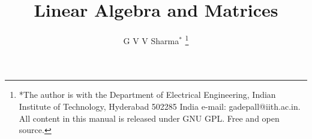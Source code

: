 \documentclass[journal,12pt,twocolumn]{IEEEtran}
\begin{document}
%


\newtheorem{theorem}{Theorem}[section]
\newtheorem{problem}{Problem}
\newtheorem{proposition}{Proposition}[section]
\newtheorem{lemma}{Lemma}[section]
\newtheorem{corollary}[theorem]{Corollary}
\newtheorem{example}{Example}[section]
\newtheorem{definition}[problem]{Definition}
\newcommand{\BEQA}{\begin{eqnarray}}
\newcommand{\EEQA}{\end{eqnarray}}
\newcommand{\define}{\stackrel{\triangle}{=}}




\providecommand{\mbf}{\mathbf}
\providecommand{\pr}[1]{\ensuremath{\Pr\left(#1\right)}}
\providecommand{\qfunc}[1]{\ensuremath{Q\left(#1\right)}}
\providecommand{\sbrak}[1]{\ensuremath{{}\left[#1\right]}}
\providecommand{\lsbrak}[1]{\ensuremath{{}\left[#1\right.}}
\providecommand{\rsbrak}[1]{\ensuremath{{}\left.#1\right]}}
\providecommand{\brak}[1]{\ensuremath{\left(#1\right)}}
\providecommand{\lbrak}[1]{\ensuremath{\left(#1\right.}}
\providecommand{\rbrak}[1]{\ensuremath{\left.#1\right)}}
\providecommand{\cbrak}[1]{\ensuremath{\left\{#1\right\}}}
\providecommand{\lcbrak}[1]{\ensuremath{\left\{#1\right.}}
\providecommand{\rcbrak}[1]{\ensuremath{\left.#1\right\}}}
\theoremstyle{remark}
\newtheorem{rem}{Remark}
\newcommand{\sgn}{\mathop{\mathrm{sgn}}}
\providecommand{\abs}[1]{\left\vert#1\right\vert}
\providecommand{\res}[1]{\Res\displaylimits_{#1}} 
\providecommand{\norm}[1]{\left\lVert#1\right\rVert}
\providecommand{\mtx}[1]{\mathbf{#1}}
\providecommand{\mean}[1]{E\left[ #1 \right]}
\providecommand{\fourier}{\overset{\mathcal{F}}{ \rightleftharpoons}}
\providecommand{\system}{\overset{\mathcal{H}}{ \longleftrightarrow}}
\newcommand{\solution}{\noindent \textbf{Solution: }}
\newcommand{\cosec}{\,\text{cosec}\,}
\providecommand{\dec}[2]{\ensuremath{\overset{#1}{\underset{#2}{\gtrless}}}}
\newcommand{\myvec}[1]{\ensuremath{\begin{pmatrix}#1\end{pmatrix}}}
\newcommand{\cmyvec}[1]{\ensuremath{\begin{pmatrix*}[c]#1\end{pmatrix*}}}
\newcommand{\mydet}[1]{\ensuremath{\begin{vmatrix}#1\end{vmatrix}}}
\newcommand{\proj}[2]{\textbf{proj}_{\vec{#1}}\vec{#2}}

\let\StandardTheFigure\thefigure
\let\vec\mathbf


\title{
Linear Algebra and Matrices
}
\author{ G V V Sharma$^{*}$%
	\thanks{*The author is with the Department
		of Electrical Engineering, Indian Institute of Technology, Hyderabad
		502285 India e-mail:  gadepall@iith.ac.in. All content in this manual is released under GNU GPL.  Free and open source.}
	
}	
\end{document}
